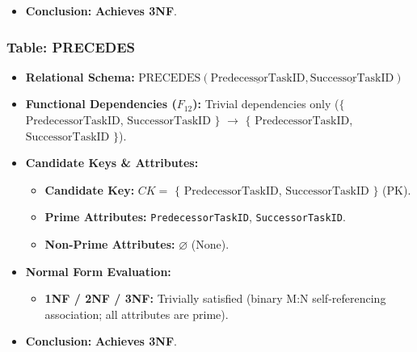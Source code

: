 \documentclass[a4paper,12pt]{report}
\providecommand{\tightlist}{%
  \setlength{\itemsep}{0pt}\setlength{\parskip}{0pt}}
\begin{document}
\begin{itemize}
  \begin{itemize}
  \item
    \textbf{1NF:} Satisfied (atomic domains).
  \item
    \textbf{2NF:} Satisfied (for composite key \(CK_{2} = \{\text{ProjectID}, \text{PhaseNumber}, \text{TaskName}\}\), no proper subset determines task schedule, cost, or status).
  \item
    \textbf{3NF:} Satisfied (all determinants are superkeys. Similar to \texttt{PROJECT}, \texttt{ActualCost} is a materialized task-level cost total whose sole determinant within \texttt{TASK} is \texttt{TaskID} and \(CK_{2}\), creating no intra-table transitive dependency).
  \end{itemize}
\item
  \textbf{Conclusion:} \textbf{Achieves 3NF}.
\end{itemize}

\subsubsection{Table: PRECEDES}\label{table-precedes}

\begin{itemize}
\item
  \textbf{Relational Schema:} \(\text{PRECEDES}(\underline{\text{PredecessorTaskID}}, \underline{\text{SuccessorTaskID}})\)
\item
  \textbf{Functional Dependencies (\(F_{12}\)):} Trivial dependencies only (\(\{\) \(\text{PredecessorTaskID}\), \(\text{SuccessorTaskID}\) \(\}\) \(\rightarrow\) \(\{\) \(\text{PredecessorTaskID}\), \(\text{SuccessorTaskID}\) \(\}\)).
\item
  \textbf{Candidate Keys \& Attributes:}

  \begin{itemize}
  \item
    \textbf{Candidate Key:} \(CK =\) \(\{\) \(\text{PredecessorTaskID}\), \(\text{SuccessorTaskID}\) \(\}\) (PK).
  \item
    \textbf{Prime Attributes:} \texttt{PredecessorTaskID}, \texttt{SuccessorTaskID}.
  \item
    \textbf{Non-Prime Attributes:} \(\varnothing\) (None).
  \end{itemize}
\item
  \textbf{Normal Form Evaluation:}

  \begin{itemize}
  \tightlist
  \item
    \textbf{1NF / 2NF / 3NF:} Trivially satisfied (binary M:N self-referencing association; all attributes are prime).
  \end{itemize}
\item
  \textbf{Conclusion:} \textbf{Achieves 3NF}.
\end{itemize}
\end{document}
